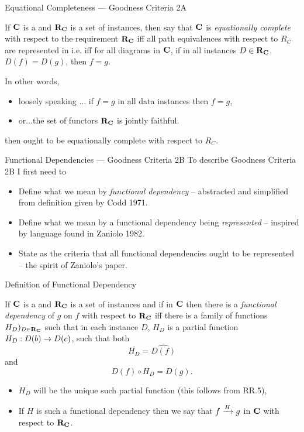 \begin{frame}{Equational Completeness --- Goodness Criteria 2A}
\pause \begin{definition}
If $\catc$ is a  \datacatw and $\reqtc$ is a set of instances,
 then say that  $\catc$ is \textit{equationally complete} with respect 
to the requirement $\reqtc$ iff all path equivalences with respect to $R_C$ are represented in \catcw 
i.e. iff for all diagrams \fgparalleldiagram in $\catc$,  
if in all instances $D \in \reqtc$, $D(f)=D(g)$,  then $f=g$.
\end{definition}
In other words,
\begin{itemize}
\item loosely speaking ... if $f=g$ in all data instances then $f=g$,
\item or...the set of functors $\reqtc$ is jointly faithful. 
\end{itemize}
\medskip
\pause {} \IfSforGammaCwithRCwords then \catcw ought to be equationally complete
with respect to $R_C$.
\end{frame}

\begin{frame}{Functional Dependencies --- Goodness Criteria 2B}
To describe Goodness Criteria 2B I first need to
\begin{itemize}
\item Define what we mean by \textit{functional dependency}
-- abstracted and simplified from definition given by Codd 1971.
\item Define what we mean by a functional dependency being \textit{represented}
-- inspired by language found in Zaniolo 1982.
\item State as the criteria that all functional dependencies ought to be represented -- 
the spirit of Zaniolo's paper. 
\end{itemize}
\end{frame}

\begin{frame}{Definition of Functional Dependency}
\begin{definition}
If $\catc$ is a \datacatw and $\reqtc$ is a set of instances and if \fgsourcediag
in $\catc$ then there is a  \textit{functional dependency} of $g$ on $f$ with respect to $\reqtc$ iff
there is a family of functions $H_D)_{D \in \reqtc}$ such that 
in each instance $D$, $H_D$ is a partial function $H_D: D(b) \morph D(c)$, such that both
$$\overline{H_D}=\widehat{D(f)}$$
and 
$$D(f) \circ H_D = D(g).$$
\end{definition}
\begin{itemize}
\item  $H_D$ will be the unique such partial function (this follows from RR.5), 
\pause \item If $H$ is such a functional dependency then we say that $\fundep{H}{f}{g}$ in $\catc$ with respect to $\reqtc$.
\end{itemize}
\end{frame}

